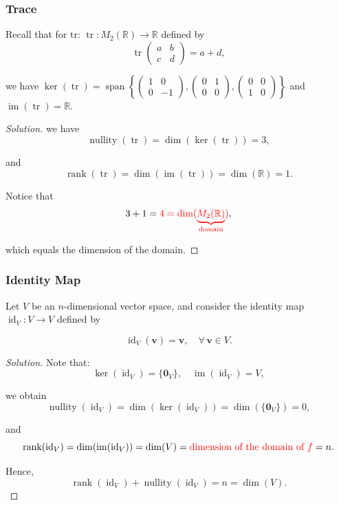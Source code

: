 \documentclass[12pt]{article}
\newenvironment{solution}
{\begin{proof}[Solution]}
{\end{proof}}
\begin{document}
\newpage

\subsubsection{Trace}

Recall that for tr: $\operatorname{tr}:M_2(\mathbb{R})\longrightarrow \mathbb{R}$ defined by
\[
\operatorname{tr}
\begin{pmatrix}
a&b\\
c&d
\end{pmatrix}
= 
a+d,
\]

we have
$
\operatorname{ker}(\operatorname{tr})=\operatorname{span}
\left\{
\begin{pmatrix}
1&0\\
0&-1
\end{pmatrix},
\begin{pmatrix}
0&1\\
0&0
\end{pmatrix},
\begin{pmatrix}
0&0\\
1&0
\end{pmatrix}
\right\}
$
and $\operatorname{im}(\operatorname{tr})=\mathbb{R}$.

\begin{solution}
we have
\[
\operatorname{nullity}(\operatorname{tr})=\operatorname{dim}(\operatorname{ker}(\operatorname{tr}))=3,
\]

and
\[
\operatorname{rank}(\operatorname{tr})=\operatorname{dim}(\operatorname{im}(\operatorname{tr}))=\operatorname{dim}(\mathbb{R})=1.
\]

Notice that
\[
3+1=\textcolor{red}{4=\operatorname{dim}(\underbrace{M_2(\mathbb{R})}_{\text{domain}})},
\]

which equals the dimension of the domain.    
\end{solution}


\subsubsection{Identity Map}
Let $V$ be an $n$-dimensional vector space, and consider the identity map $\operatorname{id}_V:V\rightarrow V$ defined by

\[
\operatorname{id}_V(\mathbf{v})=\mathbf{v},\quad\forall\,\mathbf{v}\in V.
\]

\begin{solution}

Note that:
\[
\operatorname{ker}(\operatorname{id}_V)=\{\mathbf{0}_V\},\quad\operatorname{im}(\operatorname{id}_V)=V,
\]

we obtain
\[
\operatorname{nullity}(\operatorname{id}_V)=\operatorname{dim}(\operatorname{ker}(\operatorname{id}_V))=\operatorname{dim}(\{\mathbf{0}_V\})=0,
\]

and
\[
\operatorname{rank}(\operatorname{id}_V)=\operatorname{dim}(\operatorname{im}(\operatorname{id}_V))=\operatorname{dim}(V)=\textcolor{red}{\text{dimension of the domain of }f}=n.
\]

Hence,
\[
\operatorname{rank}(\operatorname{id}_V)+\operatorname{nullity}(\operatorname{id}_V)=n=\operatorname{dim}(V).
\]

\end{solution}
\end{document}
